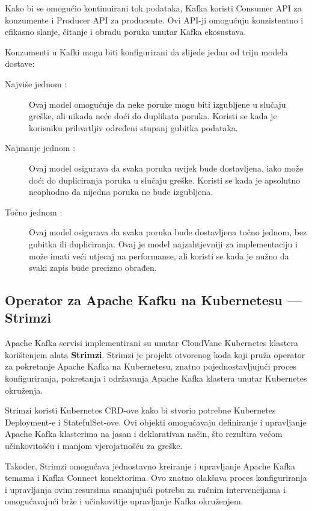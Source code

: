 \documentclass[times, utf8, diplomski]{fer}
\begin{document}
Kako bi se omogućio kontinuirani tok podataka, Kafka koristi Consumer API za konzumente i Producer API za producente. Ovi API-ji omogućuju konzistentno i efikasno slanje, čitanje i obradu poruka unutar Kafka ekosustava.

Konzumenti u Kafki mogu biti konfigurirani da slijede jedan od triju modela dostave:


\begin{description}
	\item[Najviše jednom :] Ovaj model omogućuje da neke poruke mogu biti izgubljene u slučaju greške, ali nikada neće doći do duplikata poruka. Koristi se kada je korisniku prihvatljiv određeni stupanj gubitka podataka.
	\item[Najmanje jednom :] Ovaj model osigurava da svaka poruka uvijek bude dostavljena, iako može doći do dupliciranja poruka u slučaju greške. Koristi se kada je apsolutno neophodno da nijedna poruka ne bude izgubljena.
	\item[Točno jednom :] Ovaj model osigurava da svaka poruka bude dostavljena točno jednom, bez gubitka ili dupliciranja. Ovaj je model najzahtjevniji za implementaciju i može imati veći utjecaj na performanse, ali koristi se kada je nužno da svaki zapis bude precizno obrađen.
\end{description}
	
	
\subsection{Operator za Apache Kafku na Kubernetesu --- Strimzi}
\label{sec:strimzi}

Apache Kafka servisi implementirani su unutar CloudVane Kubernetes klastera korištenjem alata \textbf{Strimzi}. Strimzi je projekt otvorenog koda koji pruža operator za pokretanje Apache Kafka na Kubernetesu, znatno pojednostavljujući proces konfiguriranja, pokretanja i održavanja Apache Kafka klastera unutar Kubernetes okruženja.

Strimzi koristi Kubernetes CRD-ove kako bi stvorio potrebne Kubernetes Deployment-e i StatefulSet-ove. Ovi objekti omogućavaju definiranje i upravljanje Apache Kafka klasterima na jasan i deklarativan način, što rezultira većom učinkovitošću i manjom vjerojatnošću za greške.

Također, Strimzi omogućava jednostavno kreiranje i upravljanje Apache Kafka temama i Kafka Connect konektorima. Ovo znatno olakšava proces konfiguriranja i upravljanja ovim resursima smanjujući potrebu za ručnim intervencijama i omogućavajući brže i učinkovitije upravljanje Kafka okruženjem.
\end{document}
